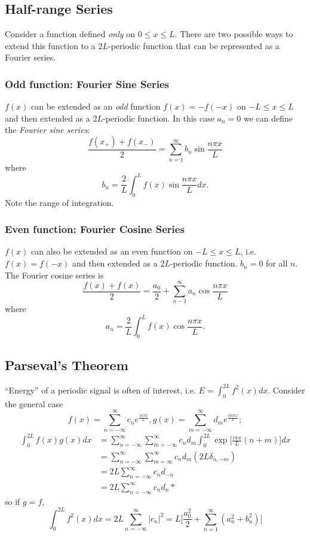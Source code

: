 \documentclass[a4paper]{article}
\begin{document}
\subsection{Half-range Series}

Consider a function defined \emph{only} on \(0 \leq x \leq L\). There are two possible ways to extend this function to a \(2L\)-periodic function that can be represented as a Fourier series.

\subsubsection{Odd function: Fourier Sine Series}

\(f(x)\) can be extended as an \emph{odd} function \(f(x)=-f(-x)\) on \(-L \leq x \leq L\) and then extended as a \(2L\)-periodic function. In this case \(a_n=0\) we can define the \emph{Fourier sine series}:
\[
  \frac{f(x_+)+f(x_-)}{2} = \sum_{n=1}^{\infty}b_n \sin \frac{n\pi x}{L}
\]
where
\[
  b_n = \frac{2}{L} \int_{0}^{L} f(x) \sin \frac{n\pi x}{L} dx.
\]
Note the range of integration.

\begin{eg}
  
\end{eg}

\subsubsection{Even function: Fourier Cosine Series}

\(f(x)\) can also be extended as an even function on \(-L\leq x\leq L\), i.e. \(f(x) = f(-x)\) and then extended as a \(2L\)-periodic function. \(b_n=0\) for all \(n\). The Fourier cosine series is
\[
  \frac{f(x)+f(x)}{2} = \frac{a_0}{2} + \sum_{n-1}^{\infty}a_n \cos \frac{n\pi x}{L}
\]
where
\[
  a_n = \frac{2}{L}\int_{0}^{L}f(x)\cos \frac{n\pi x}{L}.
\]

\subsection{Parseval's Theorem}

``Energy'' of a periodic signal is often of interest, i.e. \(E = \int_{0}^{2L}f^2(x) dx \). Consider the general case
\[
  f(x) = \sum_{n=-\infty}^{\infty}c_n e^{\frac{in\pi x}{L}}, g(x) = \sum_{m=-\infty}^{\infty}d_m e^{\frac{im\pi x}{L}};
\]
\begin{align*}
  \int_{0}^{2L} f(x) g(x) dx &= \sum_{n=-\infty}^{\infty} \sum_{m=-\infty}^{\infty} c_n d_m \int_{0}^{2L} \exp \Big [\frac{i\pi x}{L} (n+m) \Big] dx \\
  &= \sum_{n=-\infty}^{\infty} \sum_{m=\infty}^{\infty} c_n d_m (2L \delta_{n,-m}) \\
  &= 2L \sum_{n=-\infty}^{\infty} c_n d_{-n} \\
  &= 2L \sum_{n=-\infty}^{\infty} c_n d_n*
  \end{align*}
so if \(g=f\),
\[
  \int_{0}^{2L} f^2(x) dx = 2L \sum_{n=-\infty}^{\infty}|c_n|^2 = L \Big[ \frac{a_0^2}{2} + \sum_{n=1}^{\infty}(a_n^2+b_n^2) \Big]
\]
\end{document}
